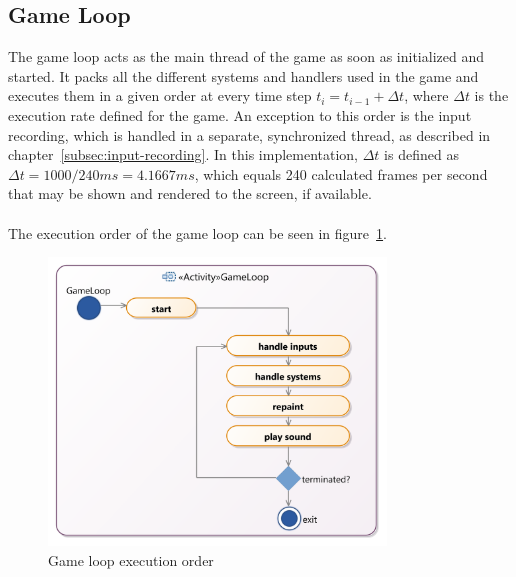 \subsection{Game Loop}\label{subsec:game-loop}
The game loop acts as the main thread of the game as soon as initialized and started.
It packs all the different systems and handlers used in the game and executes them in a given order at every time step
$t_{i} = t_{i-1} + \Delta t$, where $\Delta t$ is the execution rate defined for the game.
An exception to this order is the input recording, which is handled in a separate, synchronized thread, as described in chapter~\ref{subsec:input-recording}.
In this implementation, $\Delta t$ is defined as $\Delta t = 1000 / 240 ms = 4.1667 ms$, which equals 240 calculated frames per second that may be shown and rendered
to the screen, if available.
\\ \\
The execution order of the game loop can be seen in figure~\ref{fig:gameloop-process}.
\begin{figure}
    \centering
    \includegraphics[width=0.8\textwidth]{Pictures/res/implementation/gameloop-process}
    \caption{Game loop execution order}
    \label{fig:gameloop-process}
\end{figure}

